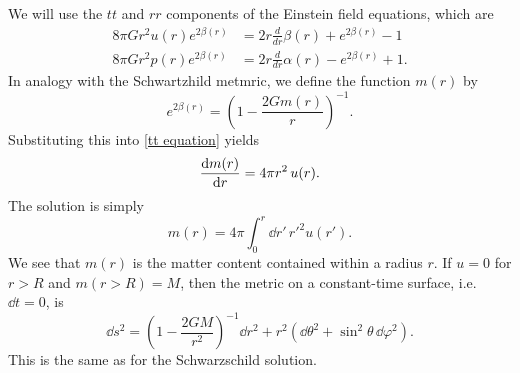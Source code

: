%
We will use the $tt$ and $rr$ components of the Einstein field equations, which are
%
\begin{align}
    \label{tt equation}
    8 \pi G r^{2} u{\left(r \right)} e^{2 \beta{\left(r \right)}} 
    & =   2 r \frac{d}{d r} \beta{\left(r \right)} + e^{2 \beta{\left(r \right)}} - 1 \\
    \label{rr equation}
    8 \pi G r^{2} p{\left(r \right)} e^{2 \beta{\left(r \right)}} 
    & = 2 r \frac{d}{d r} \alpha{\left(r \right)} - e^{2 \beta{\left(r \right)}} + 1.
\end{align}
%
In analogy with the Schwartzhild metmric, we define the function $m(r)$ by
\begin{equation}
    e^{2 \beta(r)} = \left(1 - \frac{2 G m(r)}{r} \right)^{-1}. 
\end{equation}
Substituting this into \autoref{tt equation} yields 
\begin{equation}
    \label{diff eq mass}
    \diff{m(r)}{r} = 4 \pi r^2 \, u(r).
\end{equation}
The solution is simply
\begin{equation}
    \label{mass relation}
    m(r) = 4 \pi \int_0^r \dd r' \, {r'}^2 u(r').
\end{equation}
We see that $m(r)$ is the matter content contained within a radius $r$.
If $u = 0$ for $r > R$ and $m(r>R) = M$, then the metric on a constant-time surface, i.e. $\dd t = 0$, is
%
\begin{equation}
    \dd s^2
    = 
    \left( 1 - \frac{2 G M}{r^2} \right)^{-1} \dd r^2 
    + r^2 (\dd \theta^2 + \sin^2 \theta \, \dd\varphi^2).
\end{equation} 
%
This is the same as for the Schwarzschild solution.

